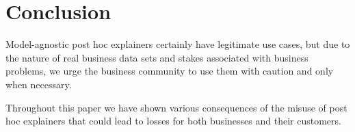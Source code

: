 \documentclass[12pt]{article}    %
\begin{document}
                

  

\section{Conclusion}
    Model-agnostic post hoc explainers certainly have legitimate use cases, but due to the nature of real business data sets and stakes associated with business problems, we urge the business community to use them with caution and only when necessary. 

    Throughout this paper we have shown various consequences of the misuse of post hoc explainers that could lead to losses for both businesses and their customers. 
        






\newpage


\end{document}
